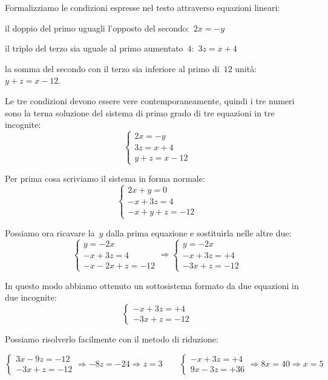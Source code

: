 \begin{soluzione}
Formalizziamo le condizioni espresse nel testo attraverso equazioni
lineari:

\begin{enumeratea}
\item il doppio del primo uguagli l'opposto del secondo:~$2x=-y$
\item il triplo del terzo sia uguale al primo aumentato~$4$:~$3z=x+4$
\item la somma del secondo con il terzo sia inferiore al primo di~$12$ 
unità:~$y+z=x-12$.
\end{enumeratea}

Le tre condizioni devono essere vere contemporaneamente, quindi i tre
numeri sono la terna soluzione del sistema di primo grado di tre equazioni in 
tre incognite:
\[\left\{\begin{array}{l}
  2x=-y\\
  3z=x+4\\
  y+z=x-12
\end{array}\right.\]

Per prima cosa scriviamo il sistema in forma normale:
\[\left\{\begin{array}{l}
  2x+y=0\\
  -x+3z=4\\
  -x+y+z=-12
\end{array}\right.\]

Possiamo ora ricavare la~$y$ dalla prima equazione e sostituirla nelle altre 
due:
\[\left\{\begin{array}{l}
  y=-2x\\
  -x+3z=4\\
  -x -2x+z=-12
\end{array}\right.
\Rightarrow
\left\{\begin{array}{l}
  y=-2x\\
  -x+3z=+4\\
  -3x+z=-12
\end{array}\right.\]

In questo modo abbiamo ottenuto un sottosistema formato da due equazioni in 
due incognite:
\[\left\{\begin{array}{l}
  -x+3z=+4\\
  -3x+z=-12
\end{array}\right.\]

Possiamo risolverlo facilmente con il metodo di riduzione:

\[\left\{\begin{array}{l}
  3x-9z=-12\\
  -3x+z=-12
\end{array}\right.
\Rightarrow -8z=-24 \Rightarrow z=3
\qquad
\left\{\begin{array}{l}
  -x+3z=+4\\
  9x-3z=+36
\end{array}\right.
\Rightarrow 8x=40 \Rightarrow x=5
\]


\end{soluzione}
